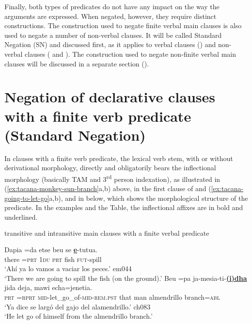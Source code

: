 \documentclass[output=paper,draft,draftmode,colorlinks,citecolor=brown]{langscibook}
\begin{document}
Finally, both types of predicates do not have any impact on the way the
arguments are expressed. When negated, however, they require distinct
constructions. The construction used to negate finite verbal main clauses
is also used to negate a number of non-verbal clauses. It will be called
Standard Negation (SN) and discussed first, as it applies to
verbal clauses () and non-verbal clauses ( and ). The construction used to negate non-finite verbal main clauses will be discussed in a separate section ().

\section{Negation of declarative clauses with a finite verb predicate (Standard Negation)}\label{sec:tacana-3}

In clauses with a finite verb predicate, the lexical verb stem,
with or without derivational morphology, directly and obligatorily bears
the inflectional morphology (basically TAM and 3\textsuperscript{rd} person
indexation), as illustrated in (\ref{ex:tacana-monkey-sun-branch}a,b)
above, in the first clause of  and
(\ref{ex:tacana-going-to-let-go}a,b), and in  below, which shows the morphological structure of the predicate. In the examples and the Table, the inflectional affixes are in bold and underlined.

\begin{exe}\ex\label{ex:tacana-going-to-let-go}  transitive and intransitive main clauses with a finite verbal predicate
\begin{xlist}
\ex\label{ex:tacana-going-to-spill}
 \gll Dapia  =da  etse  beu se \textbf{\uline{e}}-tutua.\\
there  =\textsc{prt}  1\textsc{du}  \textsc{prt}  fish
\textsc{fut}-spill\\
\glt `Ahí ya lo vamos a vaciar los peces.' em044\\
`There we are going to spill the fish (on the ground).'
\ex\label{ex:tacana-let-go}
 \gll Beu  =pa ja-mesia-ti-\textbf{\uline{(i)dha}}
 jida deja, mawi echa=jenetia.\\
    \textsc{prt}  =\textsc{rprt}
    \textsc{mid}-let\_go\_of-\textsc{mid-rem.pst}  that  man almendrillo
    branch=\textsc{abl}\\
\glt `Ya dice se largó del gajo del alamendrillo.' ch083\\
`He let go of himself from the almendrillo branch.'
\end{xlist}\end{exe}
\end{document}
